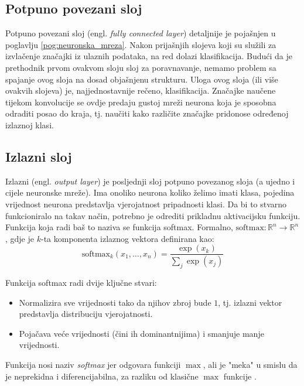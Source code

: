 \subsection{Potpuno povezani sloj}
\label{sub:dense}
Potpuno povezani sloj (engl. \textit{fully connected layer}) detaljnije je pojašnjen u poglavlju
\ref{pog:neuronska_mreza}. Nakon prijašnjih slojeva koji su služili za izvlačenje
značajki iz ulaznih podataka, na red dolazi klasifikacija. Budući da je prethodnik
prvom ovakvom sloju sloj za poravnavanje, nemamo problem sa spajanje ovog sloja na dosad
objašnjenu strukturu. Uloga ovog sloja (ili više ovakvih slojeva) je, najjednostavnije
rečeno, klasifikacija. Značajke naučene tijekom konvolucije se ovdje predaju gustoj mreži
neurona koja je sposobna odraditi posao do kraja, tj. naučiti kako različite značajke
pridonose određenoj izlaznoj klasi.

\subsection{Izlazni sloj}
\label{sub:output}
Izlazni (engl. \textit{output layer}) je posljednji sloj potpuno povezanog sloja (a ujedno i cijele
neuronske mreže). Ima onoliko neurona koliko želimo imati klasa, pojedina vrijednost
neurona predstavlja vjerojatnost pripadnosti klasi. Da bi to stvarno funkcioniralo na takav
način, potrebno je odrediti prikladnu aktivacijsku funkciju. Funkcija koja radi baš to 
naziva se funkcija softmax. 
Formalno, \( \text{softmax} : \mathbb{R}^n \to \mathbb{R}^n \),
gdje je \( k \)-ta komponenta izlaznog vektora definirana kao:
\begin{equation}
\text{softmax}_k(x_1, \dots, x_n) = \frac{\exp(x_k)}{\sum_{j} \exp(x_j)}
\end{equation}

Funkcija softmax radi dvije ključne stvari:
\begin{itemize}
    \item Normalizira sve vrijednosti tako da njihov zbroj bude \( 1 \), tj. izlazni vektor 
        predstavlja distribuciju vjerojatnosti.
    \item Pojačava veće vrijednosti (čini ih dominantnijima) i smanjuje manje vrijednosti.
\end{itemize}

Funkcija nosi naziv \textit{softmax} jer odgovara funkciji \( \max \), ali je "meka" u smislu
da je neprekidna i diferencijabilna, za razliku od klasične \( \max \) funkcije 
\cite{snajder2023logreg}.

